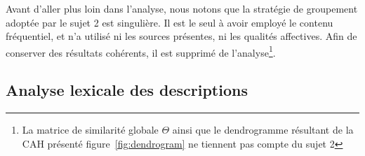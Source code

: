 Avant d'aller plus loin dans l'analyse, nous notons que la stratégie de groupement adoptée par le sujet 2 est singulière. Il est le seul à avoir employé le contenu fréquentiel, et n'a utilisé ni les sources présentes, ni les qualités affectives. Afin de conserver des résultats cohérents, il est supprimé de l'analyse\footnote{La matrice de similarité globale $\Theta$ ainsi que le dendrogramme résultant de la CAH présenté  figure~\ref{fig:dendrogram} ne tiennent pas compte du sujet 2}. 

\subsection{Analyse lexicale des descriptions}
\label{sec:ch5_xp3AnalyseLexicale}


